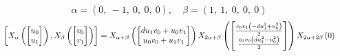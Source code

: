 \documentclass[11pt]{article}
\theoremstyle{definition}
\begin{document}
\[
\alpha = \left( 0, \  -1, \  0, \  0, \  0\right), \quad \beta = \left( 1, \  1, \  0, \  0, \  0\right)
\]
\[
\scaletoalign{\textwidth}{\left[ X_{\alpha}\left(\left[\begin{matrix}u_{0}\\u_{1}\end{matrix}\right]\right), X_{\beta}\left(\left[\begin{matrix}v_{0}\\v_{1}\end{matrix}\right]\right) \right] = X_{\alpha + \beta}\left(\left[\begin{matrix}d u_{1} v_{0} + u_{0} v_{1}\\u_{0} v_{0} + u_{1} v_{1}\end{matrix}\right]\right) X_{2\alpha + \beta}\left(\left[\begin{matrix}\frac{c_{0} v_{1} \left(- d u_{1}^{2} + u_{0}^{2}\right)}{2}\\\frac{c_{0} v_{0} \left(d u_{1}^{2} - u_{0}^{2}\right)}{2}\end{matrix}\right]\right) X_{2\alpha + 2\beta}\left(0\right)}
\]
\end{document}
